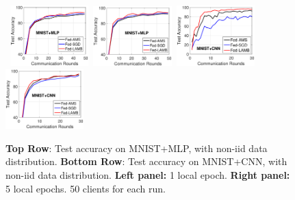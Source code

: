 \documentclass[11pt]{article}
\begin{document}
\vspace{-0.1in}
\begin{figure}[t]
    \begin{center}
        \mbox{\hspace{-0.1in}
        \includegraphics[width=0.27\textwidth]{figure/mnist_testerror_mlp_ep1_client50_iid0.eps}\hspace{-0.1in}
        \includegraphics[width=0.27\textwidth]{figure/mnist_testerror_mlp_ep5_client50_iid0.eps}\hspace{-0.1in}
        \includegraphics[width=0.27\textwidth]{figure/mnist_testerror_cnn_ep1_client60_iid0.eps}\hspace{-0.1in}
        \includegraphics[width=0.27\textwidth]{figure/mnist_testerror_cnn_ep5_client50_iid0.eps}
        }
    \end{center}
	\caption{\textbf{Top Row}: Test accuracy on MNIST+MLP, with non-iid data distribution. \textbf{Bottom Row}: Test accuracy on MNIST+CNN, with non-iid data distribution. \textbf{Left panel:} 1 local epoch. \textbf{Right panel:} 5 local epochs. 50 clients for each run.}
	\label{fig:mnist-mlp-noniid}
\end{figure}

\vspace{0.05in}
\end{document}
